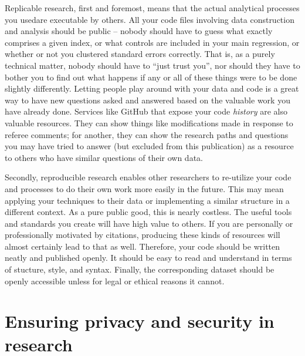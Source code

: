 Replicable research, first and foremost,
means that the actual analytical processes you usedare executable by others.\cite{dafoe2014science}
All your code files involving data construction and analysis
should be public -- nobody should have to guess what exactly comprises a given index,
or what controls are included in your main regression,
or whether or not you clustered standard errors correctly.
That is, as a purely technical matter, nobody should have to ``just trust you'',
nor should they have to bother you to find out what happens
if any or all of these things were to be done slightly differently.\cite{simmons2011false,wicherts2016degrees}
Letting people play around with your data and code is a great way to have new questions asked and answered
based on the valuable work you have already done.
Services like GitHub that expose your code \textit{history}
are also valuable resources. They can show things like modifications
made in response to referee comments; for another, they can show
the research paths and questions you may have tried to answer
(but excluded from this publication)
as a resource to others who have similar questions of their own data.

Secondly, reproducible research
enables other researchers to re-utilize your code and processes
to do their own work more easily in the future.
This may mean applying your techniques to their data
or implementing a similar structure in a different context.
As a pure public good, this is nearly costless.
The useful tools and standards you create will have high value to others.
If you are personally or professionally motivated by citations,
producing these kinds of resources will almost certainly lead to that as well.
Therefore, your code should be written neatly and published openly.
It should be easy to read and understand in terms of stucture, style, and syntax.
Finally, the corresponding dataset should be openly accessible
unless for legal or ethical reasons it cannot.


\section{Ensuring privacy and security in research}

